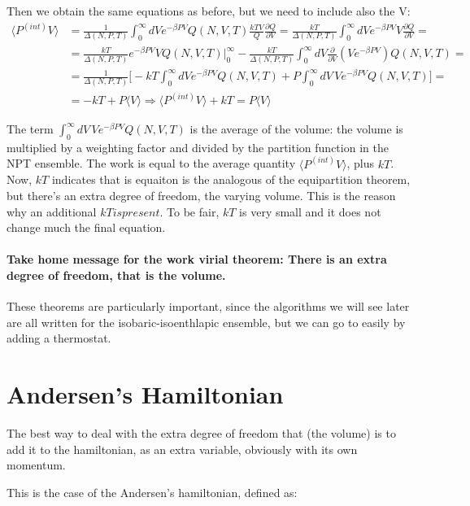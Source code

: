 Then we obtain the same equations as before, but we need to include also the V:
	\begin{align*}
		\langle P^{(int)}V\rangle &= \frac{1}{\Delta(N, P, T)}\int_0^{\infty}dVe^{-\beta PV}Q(N, V, T)\frac{kTV}{Q}\frac{\partial Q}{\partial V} = \frac{kT}{\Delta(N, P, T)}\int_0^{\infty}dVe^{-\beta PV}V\frac{\partial Q}{\partial V} = \\
															&=\frac{kT}{\Delta(N, P, T)}e^{-\beta PV}VQ(N, V, T)|_{0}^{\infty}-\frac{kT}{\Delta(N, P, T)}\int_0^{\infty}dV\frac{\partial}{\partial V}(Ve^{-\beta PV})Q(N, V, T)=\\
															&= \frac{1}{\Delta(N, P, T)}\biggl[-kT\int_0^{\infty}dVe^{-\beta PV}Q(N, V, T) + P\int_0^{\infty}dV \, Ve^{-\beta PV}Q(N, V, T)\biggr]=\\
															&=-kT+P\langle V\rangle \Rightarrow \langle P^{(int)}V\rangle + kT = P\langle V\rangle
	\end{align*}

	The term $\int_0^{\infty}dV \, Ve^{-\beta PV}Q(N, V, T)$ is the average of the volume: the volume is multiplied by a weighting factor and divided by the partition function in the NPT ensemble.
	The work is equal to the average quantity $\langle P^{(int)}V\rangle$, plus $kT$.
	Now, $kT$ indicates that is equaiton is the analogous of the equipartition theorem, but there's an extra degree of freedom, the varying volume. This is the reason why an additional $kT is present$.
	To be fair, $kT$ is very small and it does not change much the final equation.


	 \paragraph{Take home message for the work virial theorem: There is an extra degree of freedom, that is the volume.}

	These theorems are particularly important, since the algorithms we will see later are all written for the isobaric-isoenthlapic ensemble, but we can go to easily by adding a thermostat.


\section{Andersen's Hamiltonian}
The best way to deal with the extra degree of freedom that (the volume) is to add it to the hamiltonian, as an extra variable, obviously with its own momentum.

This is the case of the Andersen's hamiltonian, defined as:

